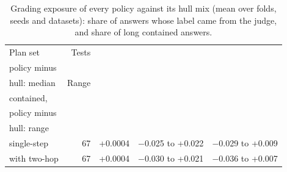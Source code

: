 \begin{table}[t]
\centering\small
\setlength{\tabcolsep}{4pt}
\caption{Grading exposure of every policy against its hull mix (mean over folds, seeds and datasets): share of answers whose label came from the judge, and share of long contained answers.}
\label{tab:rev2_exposure}
\begin{tabular*}{\linewidth}{@{\extracolsep{\fill}}lrrrr}
\toprule
Plan set & Tests & \begin{tabular}[b]{@{}r@{}}Judge share, \\ policy minus \\ hull: median\end{tabular} & Range & \begin{tabular}[b]{@{}r@{}}Long \\ contained, \\ policy minus \\ hull: range\end{tabular} \\
\midrule
single-step & 67 & +0.0004 & $-$0.025 to +0.022 & $-$0.029 to +0.009 \\
with two-hop & 67 & +0.0004 & $-$0.030 to +0.021 & $-$0.036 to +0.007 \\
\bottomrule
\end{tabular*}
\end{table}
